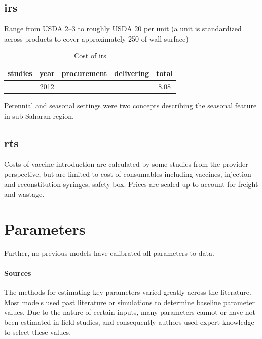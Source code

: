 \documentclass[a4paper, 12pt, twoside]{article}
\begin{document}
\subsection{\texorpdfstring{\gls{irs}}{IRS}}
Range from USDA 2–3 to roughly USDA 20 per unit\cite{Oxborough2016}
(a unit is standardized across products to cover approximately 250 of wall surface)

\begin{table}[htpb]
	\centering
	\caption{Cost of \gls{irs}}
	\label{tab:cost_of_irs}
	\begin{tabular}{cSSSS}
		\toprule
		studies           & {year} & {procurement} & {delivering} & {total} \\
		\midrule
		\cite{Walker2016} & 2012   &               &              & 8.08    \\
		\bottomrule
	\end{tabular}
\end{table}

Perennial and seasonal settings were two concepts describing the seasonal feature in sub-Saharan region.

\subsection{\texorpdfstring{\gls{rts}}{RTS}}%
\label{sub:rts}
Costs of vaccine introduction are calculated by some studies\cite{Hay2004} from the provider perspective, but are limited to cost of
consumables including vaccines, injection and reconstitution syringes, safety box.
Prices are scaled up to account for freight\cite{Winskill2017a} and wastage\cite{Hutton2006}.

\section{Parameters}
Further, no previous models have calibrated all parameters to data.

\paragraph{Sources}%
\label{par:sources}
The methods for estimating key parameters varied greatly across the literature.
Most models used past literature or simulations to determine baseline parameter values.
Due to the nature of certain inputs, many parameters cannot or have not been estimated in field studies, and consequently authors used expert knowledge to select these values.
\end{document}
